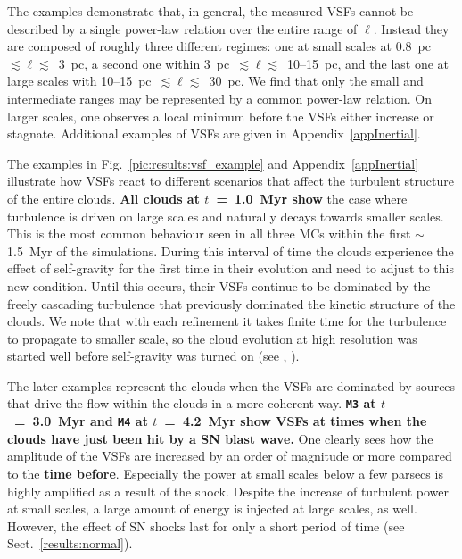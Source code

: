 The examples demonstrate that, in general, the measured VSFs cannot be described by a single power-law relation over the entire range of $\ell$.
Instead they are composed of roughly three different regimes: 
one at small scales at 0.8~pc~$\lesssim \ell \lesssim$~3~pc, a second one within 3~pc~$\lesssim \ell \lesssim$~10--15~pc, and the last one at large scales with 10--15~pc~$\lesssim \ell \lesssim$~30~pc.
We find that only the small and intermediate ranges may be represented by a common power-law relation.
On larger scales, one observes a local minimum before the VSFs either increase or stagnate.
Additional examples of VSFs are given in Appendix~\ref{appInertial}.

The examples in Fig.~\ref{pic:results:vsf_example} and Appendix~\ref{appInertial} illustrate how VSFs react to different scenarios that affect the turbulent structure of the entire clouds. 
\textbf{All clouds at $t$~=~1.0~Myr show} the case where turbulence is driven on large scales and naturally decays towards smaller scales.
This is the most common behaviour seen in all three MCs within the first $\sim$1.5~Myr of the simulations.
During this interval of time the clouds experience the effect of self-gravity for the first time in their evolution and need to adjust to this new condition.
Until this occurs, their VSFs continue to be dominated by the freely cascading turbulence that previously dominated the kinetic structure of the clouds.
We note that with each refinement it takes finite time for the turbulence to propagate to smaller scale, so the cloud evolution at high resolution was started well before self-gravity was turned on
     (see , \citealt{Seifried2017b}).

The later examples represent the clouds when the VSFs are dominated by sources that drive the flow within the clouds in a more coherent way.
\textbf{\texttt{M3} at $t$~=~3.0~Myr and \texttt{M4} at $t$~=~4.2~Myr show VSFs at times when the clouds have just been hit by a SN blast wave. }
One clearly sees how the amplitude of the VSFs are increased by an order of magnitude or more compared to the \textbf{time before}.
Especially the power at small scales below a few parsecs is highly amplified as a result of the shock.
Despite the increase of turbulent power at small scales, a large amount of energy is injected at large scales, as well.
However, the effect of SN shocks last for only a short period of time (see Sect.~\ref{results:normal}).

